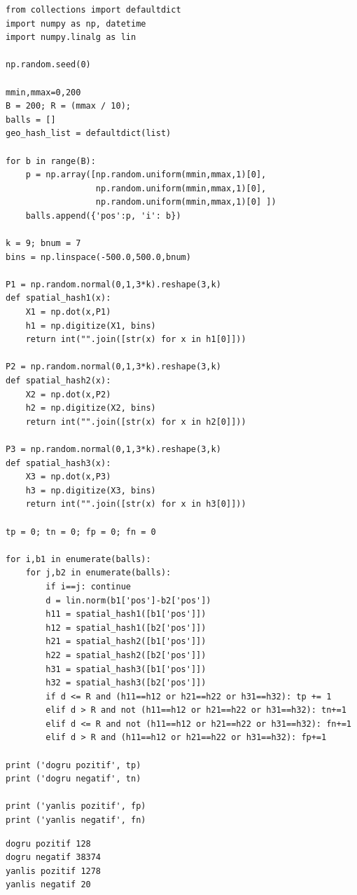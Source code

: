 \documentclass[12pt,fleqn]{article}\usepackage{../../common}
\begin{document}
\begin{verbatim}
from collections import defaultdict 
import numpy as np, datetime
import numpy.linalg as lin

np.random.seed(0)

mmin,mmax=0,200
B = 200; R = (mmax / 10);
balls = []
geo_hash_list = defaultdict(list)
    
for b in range(B):
    p = np.array([np.random.uniform(mmin,mmax,1)[0],
                  np.random.uniform(mmin,mmax,1)[0],
                  np.random.uniform(mmin,mmax,1)[0] ])
    balls.append({'pos':p, 'i': b})

k = 9; bnum = 7
bins = np.linspace(-500.0,500.0,bnum)

P1 = np.random.normal(0,1,3*k).reshape(3,k)
def spatial_hash1(x):
    X1 = np.dot(x,P1)
    h1 = np.digitize(X1, bins)
    return int("".join([str(x) for x in h1[0]]))

P2 = np.random.normal(0,1,3*k).reshape(3,k)
def spatial_hash2(x):
    X2 = np.dot(x,P2)
    h2 = np.digitize(X2, bins)
    return int("".join([str(x) for x in h2[0]]))

P3 = np.random.normal(0,1,3*k).reshape(3,k)
def spatial_hash3(x):
    X3 = np.dot(x,P3)
    h3 = np.digitize(X3, bins)
    return int("".join([str(x) for x in h3[0]]))

tp = 0; tn = 0; fp = 0; fn = 0

for i,b1 in enumerate(balls):
    for j,b2 in enumerate(balls):
        if i==j: continue
        d = lin.norm(b1['pos']-b2['pos'])
        h11 = spatial_hash1([b1['pos']])
        h12 = spatial_hash1([b2['pos']])
        h21 = spatial_hash2([b1['pos']])
        h22 = spatial_hash2([b2['pos']])
        h31 = spatial_hash3([b1['pos']])
        h32 = spatial_hash3([b2['pos']])
        if d <= R and (h11==h12 or h21==h22 or h31==h32): tp += 1        
        elif d > R and not (h11==h12 or h21==h22 or h31==h32): tn+=1
        elif d <= R and not (h11==h12 or h21==h22 or h31==h32): fn+=1
        elif d > R and (h11==h12 or h21==h22 or h31==h32): fp+=1

print ('dogru pozitif', tp)
print ('dogru negatif', tn)

print ('yanlis pozitif', fp)
print ('yanlis negatif', fn)
\end{verbatim}

\begin{verbatim}
dogru pozitif 128
dogru negatif 38374
yanlis pozitif 1278
yanlis negatif 20
\end{verbatim}
\end{document}
